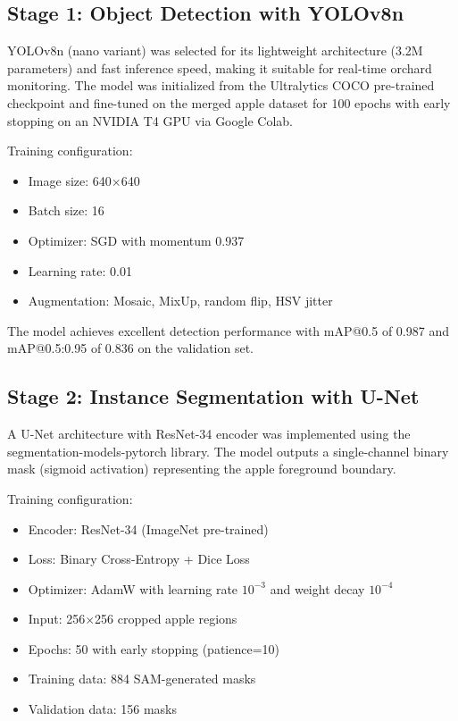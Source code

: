 \documentclass[12pt,a4paper]{article}
\begin{document}
\subsection{Stage 1: Object Detection with YOLOv8n}

YOLOv8n (nano variant) was selected for its lightweight architecture (3.2M parameters) and fast inference speed, making it suitable for real-time orchard monitoring. The model was initialized from the Ultralytics COCO pre-trained checkpoint and fine-tuned on the merged apple dataset for 100 epochs with early stopping on an NVIDIA T4 GPU via Google Colab.

Training configuration:
\begin{itemize}
  \item Image size: 640$\times$640
  \item Batch size: 16
  \item Optimizer: SGD with momentum 0.937
  \item Learning rate: 0.01
  \item Augmentation: Mosaic, MixUp, random flip, HSV jitter
\end{itemize}

The model achieves excellent detection performance with mAP@0.5 of 0.987 and mAP@0.5:0.95 of 0.836 on the validation set.

\subsection{Stage 2: Instance Segmentation with U-Net}

A U-Net architecture with ResNet-34 encoder was implemented using the segmentation-models-pytorch library. The model outputs a single-channel binary mask (sigmoid activation) representing the apple foreground boundary.

Training configuration:
\begin{itemize}
  \item Encoder: ResNet-34 (ImageNet pre-trained)
  \item Loss: Binary Cross-Entropy + Dice Loss
  \item Optimizer: AdamW with learning rate $10^{-3}$ and weight decay $10^{-4}$
  \item Input: 256$\times$256 cropped apple regions
  \item Epochs: 50 with early stopping (patience=10)
  \item Training data: 884 SAM-generated masks
  \item Validation data: 156 masks
\end{itemize}
\end{document}

